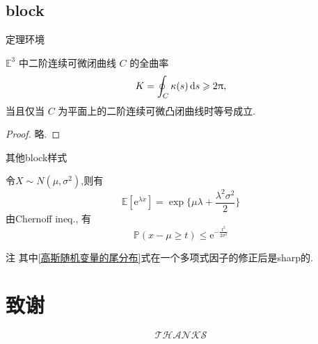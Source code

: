 \documentclass{bnuslides}
\begin{document}
\subsection{block}
\begin{frame}{定理环境}
	\begin{theorem}[Fenchel定理]
		$\mathbb{E}^3$ 中二阶连续可微闭曲线 $C$ 的全曲率
		$$
			K = \oint_C \kappa(s) \dif s \geqslant 2 \uppi,
		$$
		当且仅当 $C$ 为平面上的二阶连续可微凸闭曲线时等号成立.
	\end{theorem}
	\begin{proof}
		略.
	\end{proof}

\end{frame}
\begin{frame}{其他block样式}
	\begin{example}[高斯随机变量的尾分布]
		令$X\sim N(\mu,\sigma^2)$,则有
		\begin{equation}
			\mathbb{E}[\mathrm{e}^{\lambda x}]= \exp{\{\mu \lambda + \frac{\lambda^2\sigma^2}{2}\}}
		\end{equation}
		由Chernoff ineq., 有
		\begin{equation}
			\mathbb{P}(x-\mu \geqslant t) \leqslant \mathrm{e}^{-\frac{t^2}{2\sigma^2}}
			\label{高斯随机变量的尾分布}
		\end{equation}
	\end{example}
	\begin{alertblock}{注}
		其中\eqref{高斯随机变量的尾分布}式在一个多项式因子的修正后是sharp的.
	\end{alertblock}
\end{frame}

\section{致谢}
\begin{frame}
	\Huge
	$$
		\mathscr{THANKS}
	$$
\end{frame}
\end{document}
